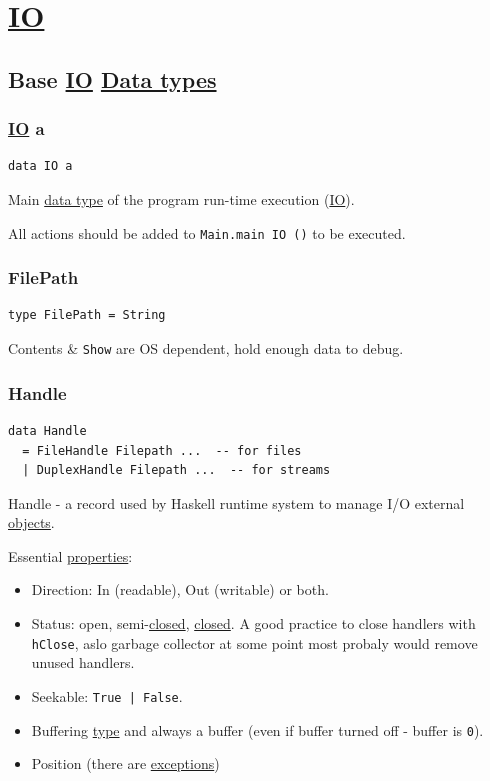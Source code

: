 \documentclass[a4paper,14pt,oneside]{book}
\begin{document}
\chapter{\hyperref[orgd944d38]{IO}}
\label{sec:orgdf1dce0}

\section{Base \hyperref[orgd944d38]{IO} \hyperref[orgfa7ff6a]{Data types}}
\label{sec:orgcca1cbd}
\subsection{\hyperref[orgd944d38]{IO} a}
\label{sec:org8822edb}

\begin{verbatim}
data IO a
\end{verbatim}

Main \hyperref[orgedd9044]{data type} of the program run-time execution (\hyperref[orgd944d38]{IO}).

All actions should be added to \texttt{Main.main IO ()} to be executed.

\subsection{FilePath}
\label{sec:orgccadb26}

\begin{verbatim}
type FilePath = String
\end{verbatim}

Contents \& \texttt{Show} are OS dependent, hold enough data to debug.

\subsection{Handle}
\label{sec:orged6eed4}

\begin{verbatim}
data Handle
  = FileHandle Filepath ...  -- for files
  | DuplexHandle Filepath ...  -- for streams
\end{verbatim}

Handle - a record used by Haskell runtime system to manage I/O external \hyperref[org70d7084]{objects}.

Essential \hyperref[org04a74a5]{properties}:

\begin{itemize}
\item Direction: In (readable), Out (writable) or both.
\item Status: open, semi-\hyperref[orga531cc1]{closed}, \hyperref[orga531cc1]{closed}.
A good practice to close handlers with \texttt{hClose}, aslo garbage collector at some point most probaly would remove unused handlers.
\item Seekable: \texttt{True | False}.
\item Buffering \hyperref[org7bdd7ea]{type} and always a buffer (even if buffer turned off - buffer is \texttt{0}).
\item Position (there are \hyperref[org644907c]{exceptions})
\end{itemize}
\end{document}
